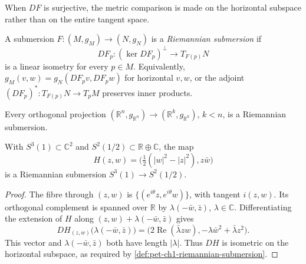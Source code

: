 When $DF$ is surjective, the metric comparison is made on the horizontal
subspace rather than on the entire tangent space.

\begin{definition}
  \label{def:pet-ch1-riemannian-submersion}
  \leanok
  A submersion $F:(M,g_M)\to(N,g_N)$ is a \emph{Riemannian submersion} if
  \[
    DF_p:(\ker DF_p)^\perp\longrightarrow T_{F(p)}N
  \]
  is a linear isometry for every $p\in M$. Equivalently,
  $g_M(v,w)=g_N(DF_pv,DF_pw)$ for horizontal $v,w$, or the adjoint
  $(DF_p)^*:T_{F(p)}N\to T_pM$ preserves inner products.
\end{definition}

\begin{example}
  \label{ex:pet-ch1-orthogonal-projection}
  \leanok
  Every orthogonal projection
  $(\mathbb{R}^n,g_{\mathbb{R}^n})\to(\mathbb{R}^k,g_{\mathbb{R}^k})$, $k<n$,
  is a Riemannian submersion.
\end{example}

\begin{example}
  \label{ex:pet-ch1-hopf-fibration}
  \leanok
  With $S^3(1)\subset\mathbb{C}^2$ and
  $S^2(1/2)\subset\mathbb{R}\oplus\mathbb{C}$, the map
  \[
    H(z,w)=\Big(\tfrac12(|w|^2-|z|^2),z\bar w\Big)
  \]
  is a Riemannian submersion $S^3(1)\to S^2(1/2)$.
\end{example}
\begin{proof}
  \leanok
  \sketch
  The fibre through $(z,w)$ is
  $\{(e^{i\theta}z,e^{i\theta}w)\}$, with tangent $i(z,w)$. Its orthogonal
  complement is spanned over $\mathbb{R}$ by
  $\lambda(-\bar w,\bar z)$, $\lambda\in\mathbb{C}$. Differentiating the
  extension of $H$ along
  $(z,w)+\lambda(-\bar w,\bar z)$ gives
  \[
    DH_{(z,w)}\big(\lambda(-\bar w,\bar z)\big)
      =\big(2\operatorname{Re}(\bar\lambda zw),
             -\lambda\bar w^2+\bar\lambda z^2\big).
  \]
  This vector and $\lambda(-\bar w,\bar z)$ both have length $|\lambda|$.
  Thus $DH$ is isometric on the horizontal subspace, as required by
  \cref{def:pet-ch1-riemannian-submersion}.
\end{proof}

